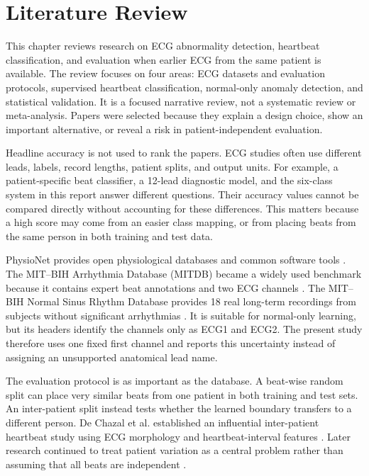 \chapter{Literature Review}\label{ch:literature}

This chapter reviews research on ECG abnormality detection, heartbeat
classification, and evaluation when earlier ECG from the same patient is
available. The review focuses on four
areas: ECG datasets and evaluation protocols, supervised heartbeat
classification, normal-only anomaly detection, and statistical validation. It
is a focused narrative review, not a systematic review or meta-analysis. Papers
were selected because they explain a design choice, show an important
alternative, or reveal a risk in patient-independent evaluation.

Headline accuracy is not used to rank the papers. ECG studies often use
different leads, labels, record lengths, patient splits, and output units. For
example, a patient-specific beat classifier, a 12-lead diagnostic model, and
the six-class system in this report answer different questions. Their accuracy
values cannot be compared directly without accounting for these differences. This matters because a high score may come
from an easier class mapping, or from placing beats from the same person in
both training and test data.

PhysioNet provides open physiological databases and common software tools
\cite{goldberger2000physionet}. The MIT--BIH Arrhythmia Database (MITDB) became
a widely used benchmark because it contains expert beat annotations and two ECG
channels \cite{moody2001impact,mitdb}. The MIT--BIH Normal Sinus Rhythm
Database provides 18 real long-term recordings from subjects without
significant arrhythmias \cite{nsrdb}. It is suitable for normal-only learning,
but its headers identify the channels only as ECG1 and ECG2. The present study
therefore uses one fixed first channel and reports this uncertainty instead of
assigning an unsupported anatomical lead name.

The evaluation protocol is as important as the database. A beat-wise random
split can place very similar beats from one patient in both training and test
sets. An inter-patient split instead tests whether the learned boundary transfers
to a different person. De Chazal et al. established an influential inter-patient
heartbeat study using ECG morphology and heartbeat-interval features
\cite{dechazal2004heartbeat}. Later research continued to treat patient variation
as a central problem rather than assuming that all beats are independent
\cite{mousavi2019seq2seq,zhang2021interpatient}.

